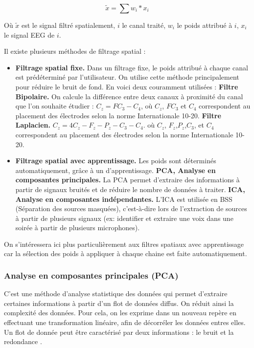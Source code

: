 \begin{equation}
		\tilde{x}=\sum{w_i*x_i}
\end{equation}

Où $\tilde{x}$ est le signal filtré spatialement, $i$ le canal traité, $w_i$ le poids attribué à $i$, $x_i$ le signal EEG de $i$.

Il existe plusieurs méthodes de filtrage spatial : 
\smallbreak
\begin{itemize}
	\item  \textbf{Filtrage spatial fixe.} Dans un filtrage fixe, le poids attribué à chaque canal est prédéterminé par l'utilisateur. On utilise cette méthode principalement pour réduire le bruit de fond. En voici deux couramment utilisées : 
	\smallbreak
	\subitem \textbf{Filtre Bipolaire.} On calcule la différence entre deux canaux à proximité du canal que l'on souhaite étudier : $ C_z = FC_3 - C_4 $, où $C_z$, $FC_3$ et $C_4$ correspondent au placement des électrodes selon la norme Internationale 10-20.
	\smallbreak
	\subitem \textbf{Filtre Laplacien.} $ C_z = 4C_z-F_z-P_z-C_3-C_4$. où $C_z$, $F_z$,$P_z$,$C_3$, et $C_4$ correspondent au placement des électrodes selon la norme Internationale 10-20.
	\smallbreak
	\item \textbf{Filtrage spatial avec apprentissage.} Les poids sont déterminés automatiquement, grâce à un d'apprentissage.
	\smallbreak
	\subitem\textbf{PCA, Analyse en composantes principales.} La PCA permet d'extraire des informations à partir de signaux bruités et de réduire le nombre de données à traiter.
	\smallbreak
	\subitem\textbf{ICA, Analyse en composantes indépendantes.} L'ICA est utilisée en BSS (Séparation des sources masquées), c'est-à-dire lors de l'extraction de sources à partir de plusieurs signaux (ex: identifier et extraire une voix dans une soirée à partir de plusieurs microphones).
	\smallbreak 
\end{itemize}

On s'intéressera ici plus particulièrement aux filtres spatiaux avec apprentissage car la sélection des poids à appliquer à chaque chaine est faite automatiquement.

\subsubsection{Analyse en composantes principales (PCA)}
\label{Subsubsecton : 4.PCA}
 C'est une méthode d'analyse statistique des données qui permet d'extraire certaines informations à partir d'un flot de données diffus. On réduit ainsi la complexité des données. Pour cela, on les exprime dans un nouveau repère en effectuant une transformation linéaire, afin de décorréler les données entres elles. Un flot de donnée peut être caractérisé par deux informations : le bruit et la redondance \cite{Lotte}.
 
